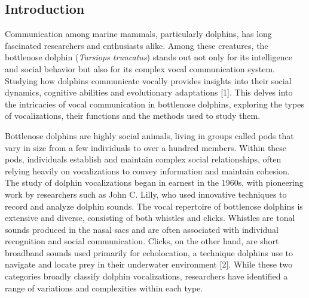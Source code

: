 \documentclass{article}
\begin{document}
\begin{multicols}{2}
\fontsize{9}{10.8}\selectfont\color{color_29791}

\section*{Introduction}
Communication among marine mammals, particularly dolphins, has long fascinated researchers and enthusiasts alike. Among these creatures, the bottlenose dolphin (\textit{Tursiops truncatus}) stands out not only for its intelligence and social behavior but also for its complex vocal communication system. Studying how dolphins communicate vocally provides insights into their social dynamics, cognitive abilities and evolutionary adaptations [1]. This delves into the intricacies of vocal communication in bottlenose dolphins, exploring the types of vocalizations, their functions and the methods used to study them.

Bottlenose dolphins are highly social animals, living in groups called pods that vary in size from a few individuals to over a hundred members. Within these pods, individuals establish and maintain complex social relationships, often relying heavily on vocalizations to convey information and maintain cohesion. The study of dolphin vocalizations began in earnest in the 1960s, with pioneering work by researchers such as John C. Lilly, who used innovative techniques to record and analyze dolphin sounds. The vocal repertoire of bottlenose dolphins is extensive and diverse, consisting of both whistles and clicks. Whistles are tonal sounds produced in the nasal sacs and are often associated with individual recognition and social communication. Clicks, on the other hand, are short broadband sounds used primarily for echolocation, a technique dolphins use to navigate and locate prey in their underwater environment [2]. While these two categories broadly classify dolphin vocalizations, researchers have identified a range of variations and complexities within each type.


\end{multicols}
\end{document}
